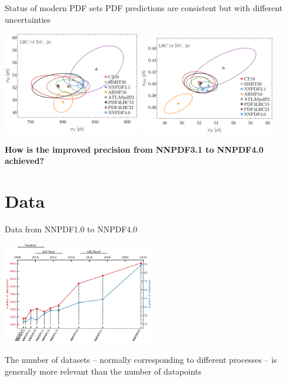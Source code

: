 \documentclass[aspectratio=169,9pt]{beamer}
\begin{document}
\begin{frame}{Status of modern PDF sets}
    PDF predictions are consistent but with different uncertainties
	\begin{center}
		\includegraphics[width=0.45\textwidth]{ZH_xsec_fixed.png}
		\includegraphics[width=0.45\textwidth]{HttbarH_xsec_fixed.png}
	\end{center}
    \begin{center}
	    \textbf{How is the improved precision from NNPDF3.1 to NNPDF4.0 achieved?}
	\end{center}
\end{frame}



\section{Data}

\begin{frame}{Data from NNPDF1.0 to NNPDF4.0}
	\begin{center}
		\includegraphics[width=0.5\textwidth]{NNPDF_data_history.pdf}
	\end{center}
	The number of datasets -- normally corresponding to different processes -- is generally more relevant than the number of datapoints
\end{frame}
\end{document}
